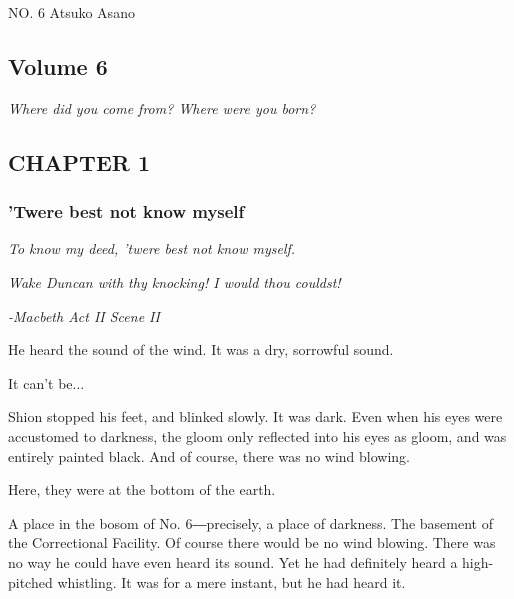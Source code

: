 \protect\hypertarget{titlepage.xhtml}{}{}

\protect\hypertarget{index_split_000.html}{}{}

NO. 6 \textbar{} Atsuko Asano

\protect\hypertarget{index_split_001_split_002.html}{}{}

\hypertarget{index_split_001_split_002.htmlux5cux23calibre_pb_0}{%
\subsection{Volume
6}\label{index_split_001_split_002.htmlux5cux23calibre_pb_0}}

\emph{Where did you come from? Where were you born?}

\hypertarget{index_split_001_split_002.htmlux5cux23calibre_pb_1}{}

\hypertarget{index_split_001_split_002.htmlux5cux23calibre_pb_0}{}

\hypertarget{index_split_001_split_002.htmlux5cux23calibre_toc_2}{%
\subsection{CHAPTER
1}\label{index_split_001_split_002.htmlux5cux23calibre_toc_2}}

\subsubsection{'Twere best not know myself}

\emph{To know my deed, 'twere best not know myself.}

\emph{Wake Duncan with thy knocking! I would thou couldst!}

\emph{-Macbeth Act II Scene II~}

He heard the sound of the wind. It was a dry, sorrowful sound.

It can't be...

Shion stopped his feet, and blinked slowly. It was dark. Even when his
eyes were accustomed to darkness, the gloom only reflected into his eyes
as gloom, and was entirely painted black. And of course, there was no
wind blowing.

Here, they were at the bottom of the earth.

A place in the bosom of No. 6―precisely, a place of darkness. The
basement of the Correctional Facility. Of course there would be no wind
blowing. There was no way he could have even heard its sound. Yet he had
definitely heard a high-pitched whistling. It was for a mere instant,
but he had heard it.


